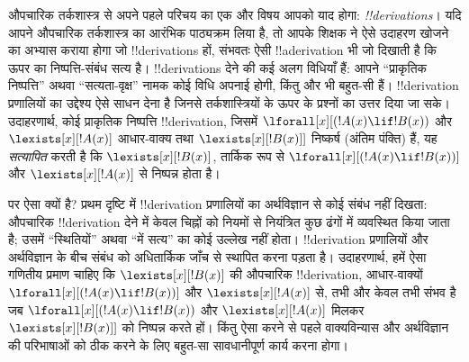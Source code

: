 \documentclass[../../../include/open-logic-section]{subfiles}
\begin{document}
औपचारिक तर्कशास्त्र से अपने पहले परिचय का एक और विषय आपको याद होगा:
\emph{!!{derivation}s}। यदि आपने औपचारिक तर्कशास्त्र का आरंभिक पाठ्यक्रम
लिया है, तो आपके शिक्षक ने ऐसे उदाहरण खोजने का अभ्यास कराया होगा जो
!!{derivation}s हों, संभवतः ऐसी !!a{derivation} भी जो दिखाती है कि ऊपर का निष्पत्ति-संबंध सत्य
है। !!{derivation}s देने की कई अलग विधियाँ हैं: आपने ``प्राकृतिक निष्पत्ति''
अथवा ``सत्यता-वृक्ष'' नामक कोई विधि अपनाई होगी, किंतु और भी बहुत-सी हैं।
!!{derivation} प्रणालियों का उद्देश्य ऐसे साधन देना है जिनसे तर्कशास्त्रियों
के ऊपर के प्रश्नों का उत्तर दिया जा सके। उदाहरणार्थ, कोई प्राकृतिक निष्पत्ति
!!{derivation}, जिसमें $\lforall[x][(!A(x) \lif !B(x))$ और
$\lexists[x][!A(x)]$ आधार-वाक्य तथा $\lexists[x][!B(x)]]$ निष्कर्ष (अंतिम
पंक्ति) हैं, यह \emph{सत्यापित} करती है कि $\lexists[x][!B(x)]$, तार्किक रूप
से $\lforall[x][(!A(x) \lif !B(x))]$ और $\lexists[x][!A(x)]$ से निष्पन्न
होता है।

पर ऐसा क्यों है? प्रथम दृष्टि में !!{derivation} प्रणालियों का अर्थविज्ञान
से कोई संबंध नहीं दिखता: औपचारिक !!{derivation} देने में केवल चिह्नों को
नियमों से नियंत्रित कुछ ढंगों में व्यवस्थित किया जाता है; उसमें ``स्थितियों''
अथवा ``में सत्य'' का कोई उल्लेख नहीं होता। !!{derivation} प्रणालियों और
अर्थविज्ञान के बीच संबंध को अधितार्किक जाँच से स्थापित करना पड़ता है।
उदाहरणार्थ, हमें ऐसा गणितीय प्रमाण चाहिए कि $\lexists[x][!B(x)]$ की औपचारिक
!!{derivation}, आधार-वाक्यों $\lforall[x][(!A(x) \lif !B(x))]$ और
$\lexists[x][!A(x)]$ से, तभी और केवल तभी संभव है जब $\lforall[x][(!A(x)
\lif !B(x))$ और $\lexists[x][!A(x)]$ मिलकर
$\lexists[x][!B(x)]]$ को निष्पन्न करते हों। किंतु ऐसा करने से पहले वाक्यविन्यास
और अर्थविज्ञान की परिभाषाओं को ठीक करने के लिए बहुत-सा सावधानीपूर्ण कार्य
करना होगा।
\end{document}
